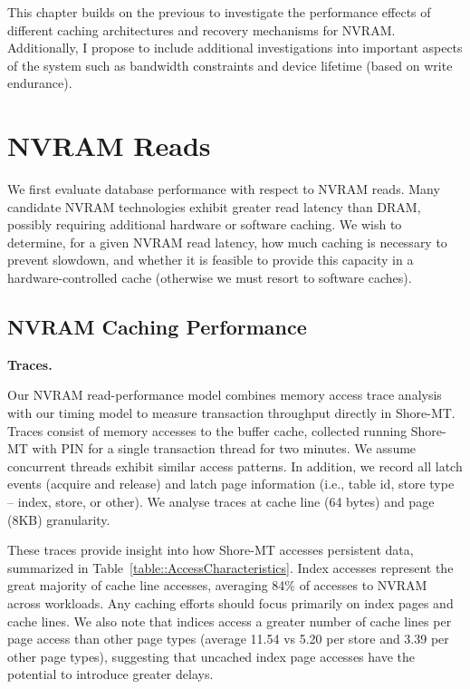 This chapter builds on the previous to investigate the performance effects of different caching architectures and recovery mechanisms for NVRAM.
Additionally, I propose to include additional investigations into important aspects of the system such as bandwidth constraints and device lifetime (based on write endurance).

\section{NVRAM Reads}
\label{sec:OLTP_eval:Reads}

We first evaluate database performance with respect to NVRAM reads.
Many candidate NVRAM technologies exhibit greater read latency than DRAM, possibly requiring additional hardware or software caching.
We wish to determine, for a given NVRAM read latency, how much caching is necessary to prevent slowdown, and whether it is feasible to provide this capacity in a hardware-controlled cache (otherwise we must resort to software caches).

\subsection{NVRAM Caching Performance}
\label{sec:OLTP_eval:Reads:Performance}

\textbf{Traces.}

Our NVRAM read-performance model combines memory access trace analysis with our timing model to measure transaction throughput directly in Shore-MT.
Traces consist of memory accesses to the buffer cache, collected running Shore-MT with PIN for a single transaction thread for two minutes.
We assume concurrent threads exhibit similar access patterns.
In addition, we record all latch events (acquire and release) and latch page information (i.e., table id, store type -- index, store, or other).
We analyse traces at cache line (64 bytes) and page (8KB) granularity.

These traces provide insight into how Shore-MT accesses persistent data, summarized in Table~\ref{table::AccessCharacteristics}.
Index accesses represent the great majority of cache line accesses, averaging 84\% of accesses to NVRAM across workloads.
Any caching efforts should focus primarily on index pages and cache lines.
We also note that indices access a greater number of cache lines per page access than other page types (average 11.54 vs 5.20 per store and 3.39 per other page types), suggesting that uncached index page accesses have the potential to introduce greater delays. 

